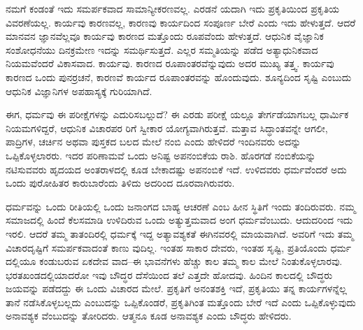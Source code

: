 ನಮಗೆ ಕಂಡಂತೆ ಇದು ಸಮರ್ಪಕವಾದ ಸಾಮಾನ್ಯೀಕರಣವಲ್ಲ. ಎರಡನೆ ಯದಾಗಿ ಇದು ಪ್ರಕೃತಿಯಿಂದ ಪ್ರಕೃತಿಯ ವಿವರಣೆಯಲ್ಲ. ಕಾರ್ಯವು ಕಾರಣವಲ್ಲ, ಕಾರಣವು ಕಾರ್ಯದಿಂದ ಸಂಪೂರ್ಣ ಬೇರೆ ಎಂದು ಇದು ಹೇಳುತ್ತದೆ. ಆದರೆ ಮಾನವನ ಜ್ಞಾನವೆಲ್ಲವೂ ಕಾರ್ಯವು ಕಾರಣದ ಮತ್ತೊಂದು ರೂಪವೆಂದು ಹೇಳುತ್ತದೆ. ಆಧುನಿಕ ವೈಜ್ಞಾನಿಕ ಸಂಶೋಧನೆಯು ದಿನಕ್ರಮೇಣ ಇದನ್ನು ಸಮರ್ಥಿಸುತ್ತದೆ. ಎಲ್ಲರ ಸಮ್ಮತಿಯನ್ನು ಪಡೆದ ಅತ್ಯಾಧುನಿಕವಾದ ನಿಯಮವೆಂದರೆ ವಿಕಾಸವಾದ. ಕಾರ್ಯವು. ಕಾರಣದ ರೂಪಾಂತರವೆನ್ನುವುದು ಅದರ ಮುಖ್ಯ ತತ್ತ್ವ. ಕಾರ್ಯವು ಕಾರಣದ ಒಂದು ಪುನರ್ರಚನೆ, ಕಾರಣವೆ ಕಾರ್ಯದ ರೂಪಾಂತರವನ್ನು ಹೊಂದುವುದು. ಶೂನ್ಯದಿಂದ ಸೃಷ್ಟಿ ಎಂಬುದು ಆಧುನಿಕ ವಿಜ್ಞಾನಿಗಳ ಅಪಹಾಸ್ಯಕ್ಕೆ ಗುರಿಯಾಗಿದೆ.

ಈಗ, ಧರ್ಮವು ಈ ಪರೀಕ್ಷೆಗಳನ್ನು ಎದುರಿಸಬಲ್ಲುದೆ? ಈ ಎರಡು ಪರೀಕ್ಷೆ ಯಲ್ಲೂ ತೇರ್ಗಡೆಯಾಗಬಲ್ಲ ಧಾರ್ಮಿಕ ನಿಯಮಗಳಿದ್ದರೆ, ಆಧುನಿಕ ವಿಚಾರಪರ ರಿಗೆ ಸ್ವೀಕಾರ ಯೋಗ್ಯವಾಗಿರುತ್ತವೆ. ಮತ್ತಾವ ಸಿದ್ಧಾಂತವನ್ನೇ ಆಗಲೀ, ಪಾದ್ರಿಗಳ, ಚರ್ಚಿನ ಅಥವಾ ಪುಸ್ತಕದ ಬಲದ ಮೇಲೆ ನಂಬಿ ಎಂದು ಹೇಳಿದರೆ ಇಂದಿನವರು ಅದನ್ನು ಒಪ್ಪಿಕೊಳ್ಳಲಾರರು. ಇದರ ಪರಿಣಾಮವೆ ಒಂದು ಅನಿಷ್ಟ ಅಪನಂಬಿಕೆಯ ರಾಶಿ. ಹೊರಗಡೆ ನಂಬಿಕೆಯನ್ನು ನಟಿಸುವವರು ಹೃದಯದ ಅಂತರಾಳದಲ್ಲಿ ಕೂಡ ಬೇಕಾದಷ್ಟು ಅಪನಂಬಿಕೆ ಇದೆ. ಉಳಿದವರು ಧರ್ಮವೆಂದರೆ ಅದು ಒಂದು ಪುರೋಹಿತರ ಕಾರುಬಾರೆಂದು ತಿಳಿದು ಅದರಿಂದ ದೂರವಾಗಿರುವರು.

ಧರ್ಮವನ್ನು ಒಂದು ರೀತಿಯಲ್ಲಿ ಒಂದು ಜನಾಂಗದ ಬಾಹ್ಯ ಆಚರಣೆ ಎಂಬ ಹೀನ ಸ್ಥಿತಿಗೆ ಇಂದು ತಂದಿರುವರು. ನಮ್ಮ ಸಮಾಜದಲ್ಲಿ ಹಿಂದೆ ಕೆಲಸಮಾಡಿ ಉಳಿದಿರುವ ಒಂದು ಅತ್ಯುತ್ತಮವಾದ ಅಂಗ ಧರ್ಮವೆಂಬುದು. ಆದುದರಿಂದ ಇದು ಇರಲಿ. ಆದರೆ ತಮ್ಮ ತಾತಂದಿರಲ್ಲಿ ಧರ್ಮಕ್ಕೆ ಇದ್ದ ಅತ್ಯಾವಶ್ಯಕತೆ ಈಗಿನವರಲ್ಲಿ ಮಾಯವಾಗಿದೆ. ಅವರಿಗೆ ಇದು ತಮ್ಮ ವಿಚಾರದೃಷ್ಟಿಗೆ ಸಮರ್ಪಕವಾದಂತೆ ಕಾಣು ವುದಿಲ್ಲ. ಇಂತಹ ಸಾಕಾರ ದೇವರು, ಇಂತಹ ಸೃಷ್ಟಿ, ಪ್ರತಿಯೊಂದು ಧರ್ಮ ದಲ್ಲಿಯೂ ಕಂಡುಬರುವ ಏಕದೇವ ವಾದ–ಈ ಭಾವನೆಗಳು ಹೆಚ್ಚು ಕಾಲ ತಮ್ಮ ಕಾಲ ಮೇಲೆ ನಿಂತುಕೊಳ್ಳಲಾರವು. ಭರತಖಂಡದಲ್ಲಿಯಾದರೋ ಇವು ಬೌದ್ಧರ ದೆಸೆಯಿಂದ ತಲೆ ಎತ್ತದೇ ಹೋದವು. ಹಿಂದಿನ ಕಾಲದಲ್ಲಿ ಬೌದ್ಧರು ಜಯವನ್ನು ಪಡೆದದ್ದು ಈ ಒಂದು ವಿಚಾರದ ಮೇಲೆ. ಪ್ರಕೃತಿಗೆ ಅನಂತಶಕ್ತಿ ಇದೆ, ಪ್ರಕೃತಿಯು ತನ್ನ ಕಾರ್ಯಗಳನ್ನೆಲ್ಲ ತಾನೆ ನಡೆಸಿಕೊಳ್ಳಬಲ್ಲದು ಎಂಬುದನ್ನು ಒಪ್ಪಿಕೊಂಡರೆ, ಪ್ರಕೃತಿಗಿಂತ ಮತ್ತೊಂದು ಬೇರೆ ಇದೆ ಎಂದು ಒಪ್ಪಿಕೊಳ್ಳುವುದು ಅನಾವಶ್ಯಕ ವೆಂಬುದನ್ನು ತೋರಿದರು. ಆತ್ಮನೂ ಕೂಡ ಅನಾವಶ್ಯಕ ಎಂದು ಬೌದ್ಧರು ಹೇಳಿದರು.

